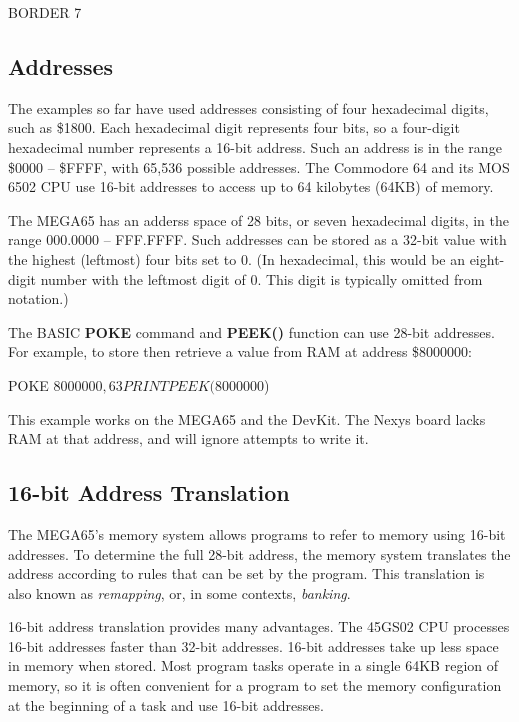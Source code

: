 \begin{screenoutput}
BORDER 7
\end{screenoutput}

\subsection{Addresses}

The examples so far have used addresses consisting of four hexadecimal digits,
such as \$1800. Each hexadecimal digit represents four bits, so a four-digit
hexadecimal number represents a 16-bit address. Such an address is in the range
\$0000 -- \$FFFF, with 65,536 possible addresses. The Commodore 64 and its MOS
6502 CPU use 16-bit addresses to access up to 64 kilobytes (64KB) of memory.

The MEGA65 has an adderss space of 28 bits, or seven hexadecimal digits, in the
range 000.0000 -- FFF.FFFF. Such addresses can be stored as a 32-bit value with
the highest (leftmost) four bits set to 0. (In hexadecimal, this would be an
eight-digit number with the leftmost digit of 0. This digit is typically
omitted from notation.)

The BASIC {\bf POKE} command and {\bf PEEK()} function can use 28-bit
addresses. For example, to store then retrieve a value from RAM at address \$8000000:

\begin{screenoutput}
POKE $8000000,63
PRINT PEEK($8000000)
\end{screenoutput}

This example works on the MEGA65 and the DevKit. The Nexys board lacks RAM
at that address, and will ignore attempts to write it.

\subsection{16-bit Address Translation}

The MEGA65's memory system allows programs to refer to memory using 16-bit
addresses. To determine the full 28-bit address, the memory system translates
the address according to rules that can be set by the program. This translation
is also known as {\em remapping}, or, in some contexts, {\em
banking}.

16-bit address translation provides many advantages. The 45GS02 CPU processes
16-bit addresses faster than 32-bit addresses. 16-bit addresses take up less
space in memory when stored. Most program tasks operate in a single 64KB region
of memory, so it is often convenient for a program to set the memory
configuration at the beginning of a task and use 16-bit addresses.

